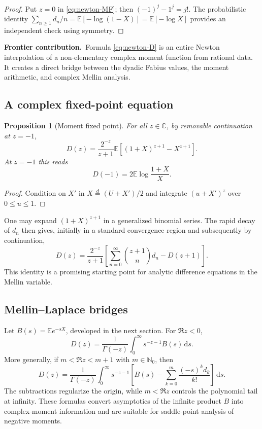 \documentclass[11pt,oneside]{article}
\newtheorem{proposition}[theorem]{Proposition}
\theoremstyle{definition}
\theoremstyle{remark}
\newcommand{\C}{\mathbb C}
\newcommand{\N}{\mathbb N}
\newcommand{\E}{\mathbb E}
\newcommand{\dd}{\,\mathrm d}
\newcommand{\falling}[2]{#1^{\underline{#2}}}
\newcommand{\newresult}{\par\medskip\noindent\textcolor{deepblue}{\textbf{Frontier contribution.}}\ }
\begin{document}
\begin{proof}
Put $z=0$ in \eqref{eq:newton-MF}; then
$(-1)^j\falling{-1}{j}=j!$.  The probabilistic identity
$\sum_{n\ge1}d_n/n=\E[-\log(1-X)]=\E[-\log X]$
provides an independent check using symmetry.
\end{proof}

\newresult Formula \eqref{eq:newton-D} is an entire Newton interpolation of a non-elementary complex moment function from rational data.  It creates a direct bridge between the dyadic Fabius values, the moment arithmetic, and complex Mellin analysis.

\subsection{A complex fixed-point equation}

\begin{proposition}[Moment fixed point]\label{prop:D-fixed-point}
For all $z\in\C$, by removable continuation at $z=-1$,
\begin{equation}\label{eq:D-fixed-point}
 D(z)=\frac{2^{-z}}{z+1}
 \E\left[(1+X)^{z+1}-X^{z+1}\right].
\end{equation}
At $z=-1$ this reads
\begin{equation}
 D(-1)=2\E\log\frac{1+X}{X}.
\end{equation}
\end{proposition}

\begin{proof}
Condition on $X'$ in $X\overset d=(U+X')/2$ and integrate $(u+X')^z$ over $0\le u\le1$.
\end{proof}

One may expand $(1+X)^{z+1}$ in a generalized binomial series.  The rapid decay of $d_n$ then gives, initially in a standard convergence region and subsequently by continuation,
\begin{equation}\label{eq:D-binomial-functional}
 D(z)=\frac{2^{-z}}{z+1}
 \left[\sum_{n=0}^{\infty}\binom{z+1}{n}d_n-D(z+1)\right].
\end{equation}
This identity is a promising starting point for analytic difference equations in the Mellin variable.

\subsection{Mellin--Laplace bridges}

Let $B(s)=\E e^{-sX}$, developed in the next section.  For $\Re z<0$,
\begin{equation}\label{eq:mellin-laplace-negative}
 D(z)=\frac1{\Gamma(-z)}\int_0^\infty s^{-z-1}B(s)\dd s.
\end{equation}
More generally, if $m<\Re z<m+1$ with $m\in\N_0$, then
\begin{equation}\label{eq:mellin-laplace-subtracted}
 D(z)=\frac1{\Gamma(-z)}\int_0^\infty s^{-z-1}
 \left[B(s)-\sum_{k=0}^{m}\frac{(-s)^kd_k}{k!}\right]\dd s.
\end{equation}
The subtractions regularize the origin, while $m<\Re z$ controls the polynomial tail at infinity.  These formulas convert asymptotics of the infinite product $B$ into complex-moment information and are suitable for saddle-point analysis of negative moments.
\end{document}

